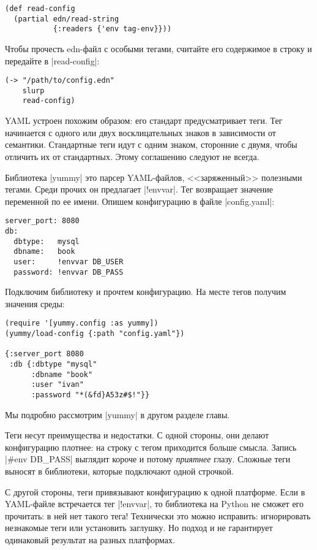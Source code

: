 \begin{verbatim}
(def read-config
  (partial edn/read-string
           {:readers {'env tag-env}}))
\end{verbatim}

Чтобы прочесть edn-файл с особыми тегами, считайте его содержимое в строку и
передайте в \spverb|read-config|:

\begin{verbatim}
(-> "/path/to/config.edn"
    slurp
    read-config)
\end{verbatim}

YAML устроен похожим образом: его стандарт предусматривает теги. Тег начинается
с одного или двух восклицательных знаков в зависимости от семантики. Стандартные
теги идут с одним знаком, сторонние с двумя, чтобы отличить их от
стандартных. Этому соглашению следуют не всегда.

Библиотека \spverb|yummy| это парсер YAML-файлов, <<заряженный>> полезными
тегами. Среди прочих он предлагает \spverb|!envvar|. Тег возвращает значение
переменной по ее имени. Опишем конфигурацию в файле \spverb|config.yaml|:

\begin{verbatim}
server_port: 8080
db:
  dbtype:   mysql
  dbname:   book
  user:     !envvar DB_USER
  password: !envvar DB_PASS
\end{verbatim}

Подключим библиотеку и прочтем конфигурацию. На месте тегов получим значения
среды:

\begin{verbatim}
(require '[yummy.config :as yummy])
(yummy/load-config {:path "config.yaml"})

{:server_port 8080
 :db {:dbtype "mysql"
      :dbname "book"
      :user "ivan"
      :password "*(&fd}A53z#$!"}}
\end{verbatim}

Мы подробно рассмотрим \spverb|yummy| в другом разделе главы.

Теги несут преимущества и недостатки. С одной стороны, они делают конфигурацию
плотнее: на строку с тегом приходится больше смысла. Запись \spverb|#env DB_PASS|
выглядит короче и потому \emph{приятнее} глазу. Сложные теги выносят в библиотеки,
которые подключают одной строчкой.

С другой стороны, теги привязывают конфигурацию к одной платформе. Если в
YAML-файле встречается тег \spverb|!envvar|, то библиотека на Python не сможет
его прочитать: в ней нет такого тега! Технически это можно исправить:
игнорировать незнакомые теги или установить заглушку. Но подход и не гарантирует
одинаковый результат на разных платформах.

